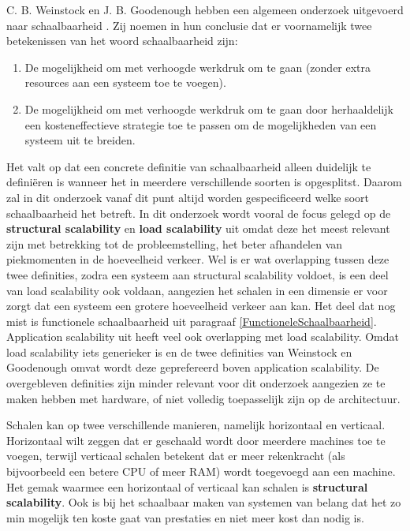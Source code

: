 C. B. Weinstock en J. B. Goodenough hebben een algemeen onderzoek uitgevoerd naar schaalbaarheid \parencite{OnSystemScalability}. Zij noemen in hun conclusie dat er voornamelijk twee betekenissen van het woord schaalbaarheid zijn:
\begin{enumerate}
	\item De mogelijkheid om met verhoogde werkdruk om te gaan (zonder extra resources aan een systeem toe te voegen).
	\item De mogelijkheid om met verhoogde werkdruk om te gaan door herhaaldelijk een kosteneffectieve strategie toe te passen om de mogelijkheden van een systeem uit te breiden.
\end{enumerate}
Het valt op dat een concrete definitie van schaalbaarheid alleen duidelijk te definiëren is wanneer het in meerdere verschillende soorten is opgesplitst. Daarom zal in dit onderzoek vanaf dit punt altijd worden gespecificeerd welke soort schaalbaarheid het betreft. In dit onderzoek wordt vooral de focus gelegd op de \textbf{structural scalability} en \textbf{load scalability} uit \parencite{ScalabilityCharacteristics} omdat deze het meest relevant zijn met betrekking tot de probleemstelling, het beter afhandelen van piekmomenten in de hoeveelheid verkeer. Wel is er wat overlapping tussen deze twee definities, zodra een systeem aan structural scalability voldoet, is een deel van load scalability ook voldaan, aangezien het schalen in een dimensie er voor zorgt dat een systeem een grotere hoeveelheid verkeer aan kan. Het deel dat nog mist is functionele schaalbaarheid uit paragraaf \ref{FunctioneleSchaalbaarheid}. Application scalability uit \parencite{AdvancedArchitecture} heeft veel ook overlapping met load scalability. Omdat load scalability iets generieker is en de twee definities van Weinstock en Goodenough \parencite{OnSystemScalability} omvat wordt deze geprefereerd boven application scalability. De overgebleven definities zijn minder relevant voor dit onderzoek aangezien ze te maken hebben met hardware, of niet volledig toepasselijk zijn op de architectuur.

Schalen kan op twee verschillende manieren, namelijk horizontaal en verticaal. Horizontaal wilt zeggen dat er geschaald wordt door meerdere machines toe te voegen, terwijl verticaal schalen betekent dat er  meer rekenkracht (als bijvoorbeeld een betere CPU of meer RAM) wordt toegevoegd aan een machine. Het gemak waarmee een horizontaal of verticaal kan schalen is \textbf{structural scalability}. Ook is bij het schaalbaar maken van systemen van belang dat het zo min mogelijk ten koste gaat van prestaties en niet meer kost dan nodig is.

